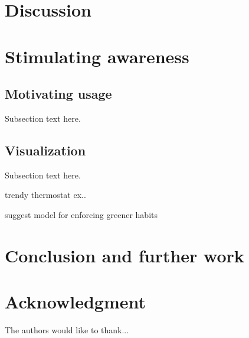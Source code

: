 \documentclass[journal]{IEEEtran}
\begin{document}
\section{Discussion}

\section{Stimulating awareness}

\subsection{Motivating usage}
Subsection text here.

\subsection{Visualization}
Subsection text here.

trendy thermostat ex..

suggest model for enforcing greener habits
\section{Conclusion and further work}


\section*{Acknowledgment}


The authors would like to thank...







%
%
%
\end{document}

